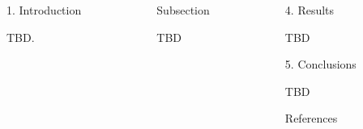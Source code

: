 \documentclass[12pt]{beamer}
\begin{document}
	\begin{frame}[t]
		\begin{columns}[t]
			\begin{column}{0.30\textwidth} \justifying %
			\begin{block}{\Large 1. Introduction} \justifying \vspace{12pt}				
			
			TBD.
				
			\vspace{18pt}
			
			\end{block}
			
			\end{column}
		
			\begin{column}{0.30\textwidth} \justifying %
			
			{\large \textcolor{title-fg}{Subsection}} \vspace{18pt}
			
			TBD
			
			\vspace{18pt}
			
			\end{column}
		
			\begin{column}{0.30\textwidth} \justifying %
		
			\begin{block}{\Large 4. Results} \justifying \vspace{12pt}				
				
			TBD
			
			\vspace{18pt}
				
			\end{block}
		
			\begin{block}{\Large 5. Conclusions} \justifying \vspace{12pt}				
				
			TBD

			\vspace{18pt}
				
			\end{block}
				
			\begin{block}{References}\justifying \vspace{12pt}\tiny
				
				
			\end{block}	
					
			\end{column}
		\end{columns}
	\end{frame}
\end{document}
